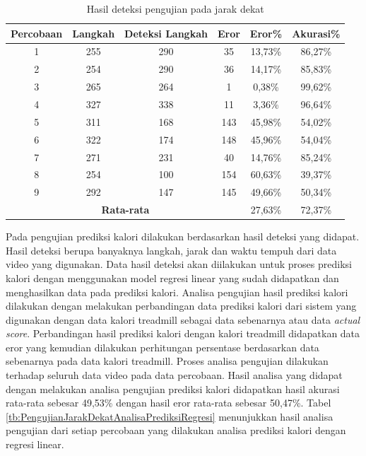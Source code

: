 \begin{longtable}{|c|c|c|c|c|c|}
  \caption{Hasil deteksi pengujian pada jarak dekat}
  \label{tb:PengujianJarakDekatAnalisaDeteksi}                                   \\
  \hline
  \rowcolor[HTML]{C0C0C0}
  \textbf{Percobaan} & \textbf{Langkah} & \textbf{Deteksi Langkah} & \textbf{Eror} & \textbf{Eror\%} & \textbf{Akurasi\%} \\
  \hline
  1   & 255   & 290  & 35  & 13,73\%    & 86,27\%   \\
  \hline
  2   & 254   & 290  & 36  & 14,17\%    & 85,83\%   \\
  \hline
  3   & 265   & 264  & 1   & 0,38\%     & 99,62\%   \\
  \hline
  4   & 327   & 338  & 11  & 3,36\%     & 96,64\%   \\
  \hline
  5   & 311   & 168  & 143 & 45,98\%    & 54,02\%   \\
  \hline
  6   & 322   & 174  & 148 & 45,96\%    & 54,04\%   \\
  \hline
  7   & 271   & 231  & 40  & 14,76\%    & 85,24\%   \\
  \hline
  8   & 254   & 100  & 154 & 60,63\%    & 39,37\%   \\
  \hline
  9   & 292   & 147  & 145 & 49,66\%    & 50,34\%   \\
  \hline

  \multicolumn{4}{|c|}{\textbf{Rata-rata}} & 27,63\% & 72,37\% \\
  \hline
\end{longtable}

Pada pengujian prediksi kalori dilakukan berdasarkan hasil deteksi yang didapat. Hasil deteksi berupa banyaknya langkah, jarak dan waktu tempuh dari data video yang digunakan. Data hasil deteksi akan diilakukan untuk proses prediksi kalori dengan menggunakan model regresi linear yang sudah didapatkan dan menghasilkan data pada prediksi kalori. Analisa pengujian hasil prediksi kalori dilakukan dengan melakukan perbandingan data prediksi kalori dari sistem yang digunakan dengan data kalori treadmill sebagai data sebenarnya atau data \emph{actual score}. Perbandingan hasil prediksi kalori dengan kalori treadmill didapatkan data eror yang kemudian dilakukan perhitungan persentase berdasarkan data sebenarnya pada data kalori treadmill. Proses analisa pengujian dilakukan terhadap seluruh data video pada data percobaan. Hasil analisa yang didapat dengan melakukan analisa pengujian prediksi kalori didapatkan hasil akurasi rata-rata sebesar 49,53\% dengan hasil eror rata-rata sebesar 50,47\%. Tabel \ref{tb:PengujianJarakDekatAnalisaPrediksiRegresi} menunjukkan hasil analisa pengujian dari setiap percobaan yang dilakukan analisa prediksi kalori dengan regresi linear.

